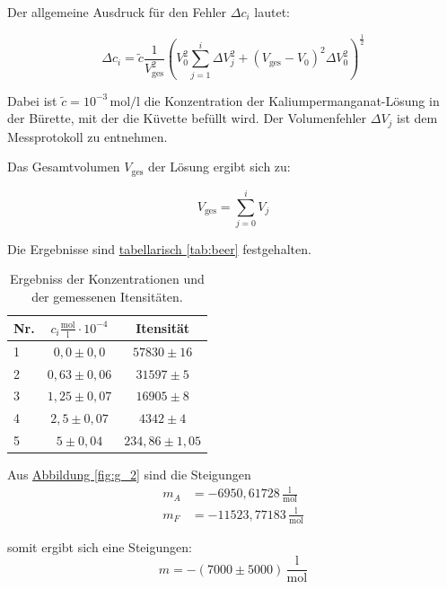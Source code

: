 Der allgemeine Ausdruck für den Fehler \(\Delta c_i\) lautet:

\begin{equation}
\Delta c_i = \tilde{c} \frac{1}{V_{\text{ges}}^2}
\left(
V_0^2 \sum_{j=1}^{i} \Delta V_j^2 + (V_{\text{ges}} - V_0)^2 \Delta V_0^2
\right)^{\frac{1}{2}}
\end{equation}

Dabei ist \(\tilde{c} = 10^{-3}\,\text{mol/l}\) die Konzentration der Kaliumpermanganat-Lösung in der Bürette, mit der die Küvette befüllt wird. Der Volumenfehler \(\Delta V_j\) ist dem Messprotokoll zu entnehmen.

Das Gesamtvolumen \(V_{\text{ges}}\) der Lösung ergibt sich zu:

\begin{equation}
V_{\text{ges}} = \sum_{j=0}^{i} V_j
\end{equation}

Die Ergebnisse sind \hyperref[tab:beer]{tabellarisch \ref*{tab:beer}} festgehalten.
\begin{table}[!ht]
    \centering
    \begin{tabular}{l | c | c}
        \toprule
        Nr. & $c_i {\mathrm{\frac{mol}{l}} \cdot 10^{-4}}$ & Itensität \\
        \hline
        1 & $0,0 \pm 0,0$ & $57830 \pm 16$ \\
        2 & $0,63 \pm 0,06$ & $31597 \pm 5$ \\
        3 & $1,25 \pm 0,07$ & $16905 \pm 8$ \\
        4 & $2,5 \pm 0,07$ & $4342 \pm 4$ \\
        5 & $5 \pm 0,04$ & $234,86 \pm 1,05$ \\         
        \bottomrule
    \end{tabular}
    \label{tab_beer}
    \caption{Ergebniss der Konzentrationen und der gemessenen Itensitäten.}
\end{table}

Aus \hyperref[fig:g_2]{Abbildung \ref*{fig:g_2}} sind die Steigungen 
\begin{align}
    m_A &= -6950,61728 \, \mathrm{\frac{l}{mol}}\\
    m_F &= -11523,77183 \, \mathrm{\frac{l}{mol}}
\end{align}

somit ergibt sich eine Steigungen:
\begin{equation}
\boxed{
    m = -(7000 \pm 5000) \, \mathrm{\frac{l}{mol}}
}
\end{equation}

